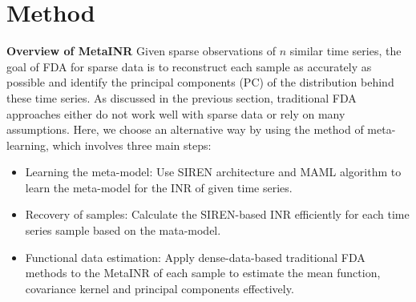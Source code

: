 \documentclass{article}
\begin{document}
\section{Method}
\textbf{Overview of MetaINR}
Given sparse observations of $n$ similar time series, the goal of FDA for sparse data is to reconstruct each sample as accurately as possible and identify the principal components (PC) of the distribution behind these time series.
As discussed in the previous section, traditional FDA approaches either do not work well with sparse data or rely on many assumptions.
Here, we choose an alternative way by using the method of meta-learning, which involves three main steps:



\begin{itemize}
  \item Learning the meta-model: Use SIREN architecture and MAML algorithm to learn the meta-model for the INR of given time series.
  \item Recovery of samples: Calculate the SIREN-based INR efficiently for each time series sample based on the mata-model.
  \item Functional data estimation: Apply dense-data-based traditional FDA methods to the MetaINR of each sample to estimate the mean function, covariance kernel and principal components effectively.
\end{itemize}
\end{document}

